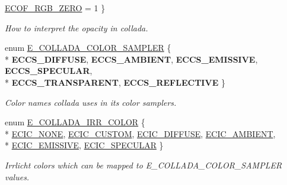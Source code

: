 \begin{DoxyCompactItemize}
\hyperlink{namespaceirr_1_1scene_af7dadd5b96b683cfe1800f343c4f6619aeeb0b34217f227d32be4876aeeaaf70f}{E\+C\+O\+F\+\_\+\+R\+G\+B\+\_\+\+Z\+E\+RO} = 1
 \}\begin{DoxyCompactList}\small\item\em How to interpret the opacity in collada. \end{DoxyCompactList}
\item 
enum \hyperlink{namespaceirr_1_1scene_a6204218341c6b449d879cd8367b2f8d8}{E\+\_\+\+C\+O\+L\+L\+A\+D\+A\+\_\+\+C\+O\+L\+O\+R\+\_\+\+S\+A\+M\+P\+L\+ER} \{ \\*
{\bfseries E\+C\+C\+S\+\_\+\+D\+I\+F\+F\+U\+SE}, 
{\bfseries E\+C\+C\+S\+\_\+\+A\+M\+B\+I\+E\+NT}, 
{\bfseries E\+C\+C\+S\+\_\+\+E\+M\+I\+S\+S\+I\+VE}, 
{\bfseries E\+C\+C\+S\+\_\+\+S\+P\+E\+C\+U\+L\+AR}, 
\\*
{\bfseries E\+C\+C\+S\+\_\+\+T\+R\+A\+N\+S\+P\+A\+R\+E\+NT}, 
{\bfseries E\+C\+C\+S\+\_\+\+R\+E\+F\+L\+E\+C\+T\+I\+VE}
 \}\hypertarget{namespaceirr_1_1scene_a6204218341c6b449d879cd8367b2f8d8}{}\label{namespaceirr_1_1scene_a6204218341c6b449d879cd8367b2f8d8}
\begin{DoxyCompactList}\small\item\em Color names collada uses in it\textquotesingle{}s color samplers. \end{DoxyCompactList}
\item 
enum \hyperlink{namespaceirr_1_1scene_a61cba210038d6d843b81d9282f1cac7e}{E\+\_\+\+C\+O\+L\+L\+A\+D\+A\+\_\+\+I\+R\+R\+\_\+\+C\+O\+L\+OR} \{ \\*
\hyperlink{namespaceirr_1_1scene_a61cba210038d6d843b81d9282f1cac7ea46a948a882be4d21af671d4dff939a12}{E\+C\+I\+C\+\_\+\+N\+O\+NE}, 
\hyperlink{namespaceirr_1_1scene_a61cba210038d6d843b81d9282f1cac7eae1ff98b61069652418cc36e411de863c}{E\+C\+I\+C\+\_\+\+C\+U\+S\+T\+OM}, 
\hyperlink{namespaceirr_1_1scene_a61cba210038d6d843b81d9282f1cac7eac230a09c9fc579cc1776baea37731329}{E\+C\+I\+C\+\_\+\+D\+I\+F\+F\+U\+SE}, 
\hyperlink{namespaceirr_1_1scene_a61cba210038d6d843b81d9282f1cac7ea1508a71bf85cb6f1303df8ae240cde75}{E\+C\+I\+C\+\_\+\+A\+M\+B\+I\+E\+NT}, 
\\*
\hyperlink{namespaceirr_1_1scene_a61cba210038d6d843b81d9282f1cac7ea212908c2b2af576861553e4b441ac7f3}{E\+C\+I\+C\+\_\+\+E\+M\+I\+S\+S\+I\+VE}, 
\hyperlink{namespaceirr_1_1scene_a61cba210038d6d843b81d9282f1cac7eae62f9539794fa526128ea1eed9840b7d}{E\+C\+I\+C\+\_\+\+S\+P\+E\+C\+U\+L\+AR}
 \}\begin{DoxyCompactList}\small\item\em Irrlicht colors which can be mapped to E\+\_\+\+C\+O\+L\+L\+A\+D\+A\+\_\+\+C\+O\+L\+O\+R\+\_\+\+S\+A\+M\+P\+L\+ER values. \end{DoxyCompactList}

\end{DoxyCompactItemize}

